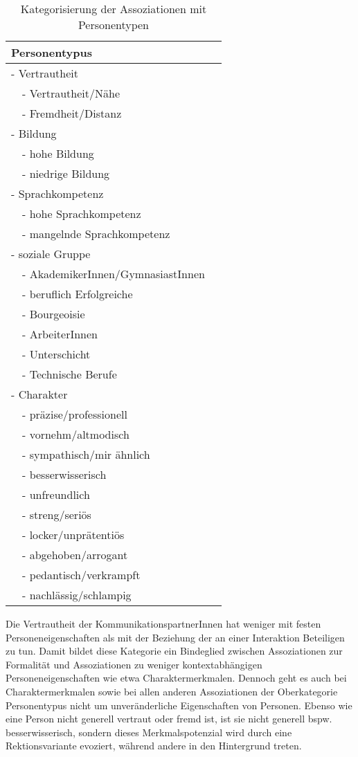 \begin{table}
\centering
\begin{tabular}{lll}
\multicolumn{2}{l}{Personentypus} \\ \hline
\multicolumn{2}{l}{- Vertrautheit} \\ %
 & - Vertrautheit/Nähe \\ 
 & - Fremdheit/Distanz \\ \hline
\multicolumn{2}{l}{- Bildung} \\ %
 & - hohe Bildung \\ 
 & - niedrige Bildung \\  \hline
\multicolumn{2}{l}{- Sprachkompetenz} \\ %
 & - hohe Sprachkompetenz \\ 
 & - mangelnde Sprachkompetenz \\  \hline
\multicolumn{2}{l}{- soziale Gruppe} \\ %
 & - AkademikerInnen/GymnasiastInnen \\
 & - beruflich Erfolgreiche \\
 & - Bourgeoisie \\
 & - ArbeiterInnen \\
 & - Unterschicht \\
 & - Technische Berufe \\ \hline
\multicolumn{2}{l}{- Charakter} \\ %
 & - präzise/professionell \\ 
 & - vornehm/altmodisch \\
 & - sympathisch/mir ähnlich \\
 & - besserwisserisch \\
 & - unfreundlich \\
 & - streng/seriös \\
 & - locker/unprätentiös \\
 & - abgehoben/arrogant \\
 & - pedantisch/verkrampft \\
 & - nachlässig/schlampig \\
\end{tabular}
\caption{Kategorisierung der Assoziationen mit Personentypen}
\label{table:KatPerson}
\end{table}

Die Vertrautheit der KommunikationspartnerInnen hat weniger mit festen Personeneigenschaften als mit der Beziehung der an einer Interaktion Beteiligen zu tun. 
Damit bildet diese Kategorie ein Bindeglied zwischen Assoziationen zur Formalität und Assoziationen zu weniger kontextabhängigen Personeneigenschaften wie etwa Charaktermerkmalen. 
Dennoch geht es auch bei Charaktermerkmalen sowie bei allen anderen Assoziationen der Oberkategorie \glqq Personentypus\grqq{} nicht um unveränderliche Eigenschaften von Personen. 
Ebenso wie eine Person nicht generell vertraut oder fremd ist, ist sie nicht generell bspw. besserwisserisch, sondern dieses Merkmalspotenzial wird durch eine Rektionsvariante evoziert, während andere in den Hintergrund treten. 

